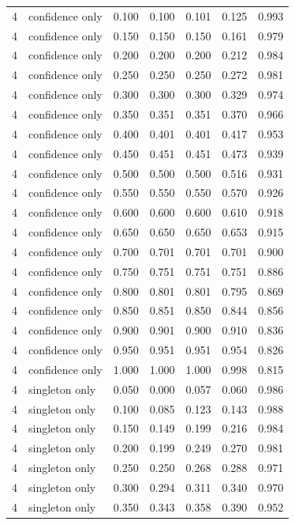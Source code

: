 \begin{tabular}{rlrrrrr}
4 & confidence only & 0.100 & 0.100 & 0.101 & 0.125 & 0.993 \\
4 & confidence only & 0.150 & 0.150 & 0.150 & 0.161 & 0.979 \\
4 & confidence only & 0.200 & 0.200 & 0.200 & 0.212 & 0.984 \\
4 & confidence only & 0.250 & 0.250 & 0.250 & 0.272 & 0.981 \\
4 & confidence only & 0.300 & 0.300 & 0.300 & 0.329 & 0.974 \\
4 & confidence only & 0.350 & 0.351 & 0.351 & 0.370 & 0.966 \\
4 & confidence only & 0.400 & 0.401 & 0.401 & 0.417 & 0.953 \\
4 & confidence only & 0.450 & 0.451 & 0.451 & 0.473 & 0.939 \\
4 & confidence only & 0.500 & 0.500 & 0.500 & 0.516 & 0.931 \\
4 & confidence only & 0.550 & 0.550 & 0.550 & 0.570 & 0.926 \\
4 & confidence only & 0.600 & 0.600 & 0.600 & 0.610 & 0.918 \\
4 & confidence only & 0.650 & 0.650 & 0.650 & 0.653 & 0.915 \\
4 & confidence only & 0.700 & 0.701 & 0.701 & 0.701 & 0.900 \\
4 & confidence only & 0.750 & 0.751 & 0.751 & 0.751 & 0.886 \\
4 & confidence only & 0.800 & 0.801 & 0.801 & 0.795 & 0.869 \\
4 & confidence only & 0.850 & 0.851 & 0.850 & 0.844 & 0.856 \\
4 & confidence only & 0.900 & 0.901 & 0.900 & 0.910 & 0.836 \\
4 & confidence only & 0.950 & 0.951 & 0.951 & 0.954 & 0.826 \\
4 & confidence only & 1.000 & 1.000 & 1.000 & 0.998 & 0.815 \\
4 & singleton only & 0.050 & 0.000 & 0.057 & 0.060 & 0.986 \\
4 & singleton only & 0.100 & 0.085 & 0.123 & 0.143 & 0.988 \\
4 & singleton only & 0.150 & 0.149 & 0.199 & 0.216 & 0.984 \\
4 & singleton only & 0.200 & 0.199 & 0.249 & 0.270 & 0.981 \\
4 & singleton only & 0.250 & 0.250 & 0.268 & 0.288 & 0.971 \\
4 & singleton only & 0.300 & 0.294 & 0.311 & 0.340 & 0.970 \\
4 & singleton only & 0.350 & 0.343 & 0.358 & 0.390 & 0.952 \\

\end{tabular}
